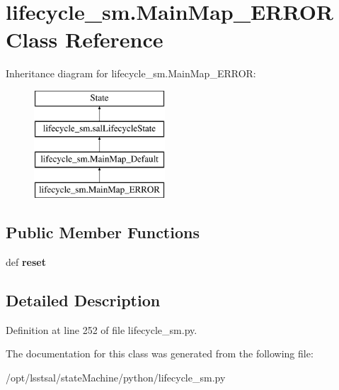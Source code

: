 \hypertarget{classlifecycle__sm_1_1_main_map___e_r_r_o_r}{\section{lifecycle\-\_\-sm.\-Main\-Map\-\_\-\-E\-R\-R\-O\-R Class Reference}
\label{classlifecycle__sm_1_1_main_map___e_r_r_o_r}
}
Inheritance diagram for lifecycle\-\_\-sm.\-Main\-Map\-\_\-\-E\-R\-R\-O\-R\-:\begin{figure}[H]
\begin{center}
\leavevmode
\includegraphics[height=4.000000cm]{classlifecycle__sm_1_1_main_map___e_r_r_o_r}
\end{center}
\end{figure}
\subsection*{Public Member Functions}
\begin{DoxyCompactItemize}
\item 
\hypertarget{classlifecycle__sm_1_1_main_map___e_r_r_o_r_ab0aa18f373b2c07f272a74358f3c17e4}{def {\bfseries reset}}\label{classlifecycle__sm_1_1_main_map___e_r_r_o_r_ab0aa18f373b2c07f272a74358f3c17e4}

\end{DoxyCompactItemize}


\subsection{Detailed Description}


Definition at line 252 of file lifecycle\-\_\-sm.\-py.



The documentation for this class was generated from the following file\-:\begin{DoxyCompactItemize}
\item 
/opt/lsstsal/state\-Machine/python/lifecycle\-\_\-sm.\-py\end{DoxyCompactItemize}
